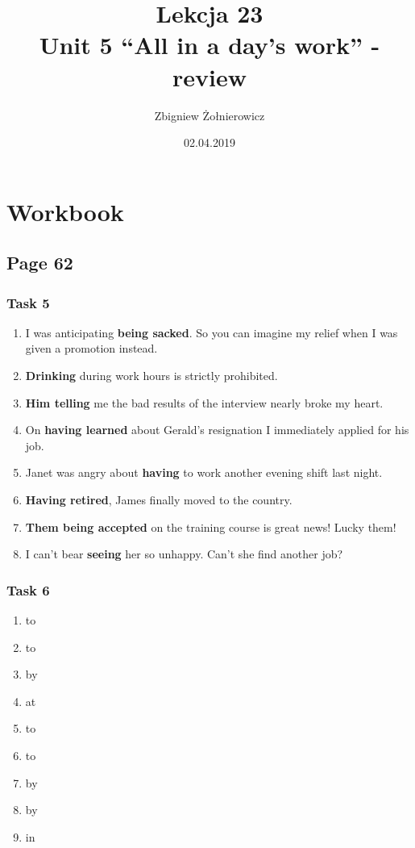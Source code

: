 \documentclass{article}
\begin{document}
\title{{\huge Lekcja 23} \\
{\large Unit 5 ``All in a day's work'' - review}}
\author{Zbigniew Żołnierowicz}
\date{02.04.2019}
\maketitle
\section{Workbook}
\subsection{Page 62}
\subsubsection{Task 5}
\begin{enumerate}
    \item I was anticipating \textbf{being sacked}. So you can imagine my relief when I was given a promotion instead.
    \item \textbf{Drinking} during work hours is strictly prohibited.
    \item \textbf{Him telling} me the bad results of the interview nearly broke my heart.
    \item On \textbf{having learned} about Gerald's resignation I immediately applied for his job.
    \item Janet was angry about \textbf{having} to work another evening shift last night.
    \item \textbf{Having retired}, James finally moved to the country.
    \item \textbf{Them being accepted} on the training course is great news! Lucky them!
    \item I can't bear \textbf{seeing} her so unhappy. Can't she find another job?
\end{enumerate}
\subsubsection{Task 6}
\begin{enumerate}
    \item to
    \item to
    \item by
    \item at
    \item to
    \item to
    \item by
    \item by
    \item in
\end{enumerate}
\end{document}
